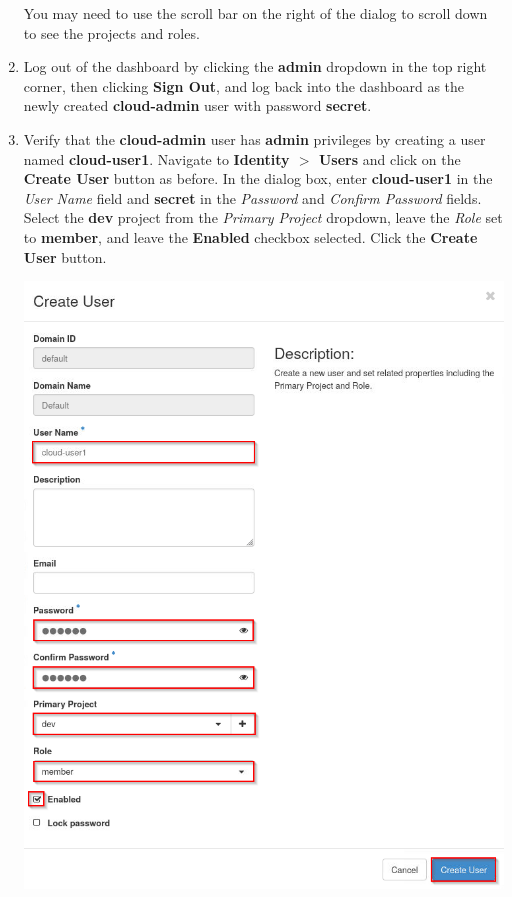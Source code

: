 \documentclass[letterpaper, 12pt]{article}
\begin{document}
\begin{enumerate}
    \begin{tipbox}
        You may need to use the scroll bar on the right of the dialog to scroll down to see the projects and roles.
    \end{tipbox}

    \item Log out of the dashboard by clicking the \textbf{admin} dropdown in the top right corner, then clicking
    \textbf{Sign Out}, and log back into the dashboard as the newly created \textbf{cloud-admin} user with password
    \textbf{secret}.

    \item Verify that the \textbf{cloud-admin} user has \textbf{admin} privileges by creating a user named
    \textbf{cloud-user1}. Navigate to \textbf{Identity $>$ Users} and click on the \textbf{Create User} button
    as before. In the dialog box, enter \textbf{cloud-user1} in the \textit{User Name} field and \textbf{secret} in the
    \textit{Password} and \textit{Confirm Password} fields. Select the \textbf{dev} project from the \textit{Primary
    Project} dropdown, leave the \textit{Role} set to \textbf{member}, and leave the \textbf{Enabled} checkbox
    selected. Click the \textbf{Create User} button.

    \begin{center}
        \includegraphics[width=\linewidth]{images/part5/step5.png}
    \end{center}


\end{enumerate}
\end{document}
